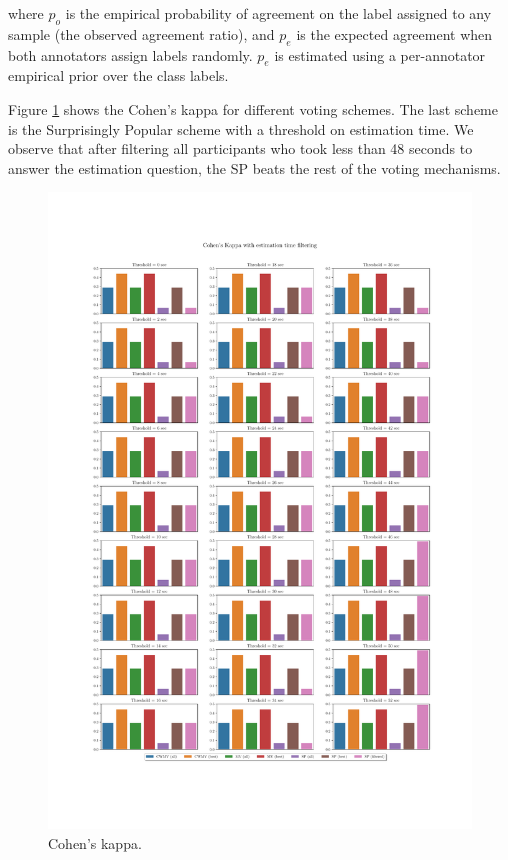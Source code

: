 \documentclass{report}
\theoremstyle{definition}
\begin{document}
where $p_o$ is the empirical probability of agreement on the label assigned to any sample (the observed agreement ratio), and $p_e$ is the expected agreement when both annotators assign labels randomly. $p_e$ is estimated using a per-annotator empirical prior over the class labels.\cite{cohen:kappa}

Figure \ref{fig:exp1_cohen_kappa} shows the Cohen's kappa for different voting schemes. The last scheme is the Surprisingly Popular scheme with a threshold on estimation time. We observe that after filtering all participants who took less than 48 seconds to answer the estimation question, the SP beats the rest of the voting mechanisms.


\newpage
\thispagestyle{empty}
\begin{center}
\begin{figure}[H]
\vspace*{-3.2cm}
\hspace*{-3cm}
\begin{minipage}{1.43\linewidth}
    \centering
    \includegraphics[width=\textwidth]{exp1_cohens_filtering.pdf}
    \caption{Cohen's kappa.}
    \label{fig:exp1_cohen_kappa}
\end{minipage}
\end{figure}
\end{center}

\printbibliography
\end{document}
